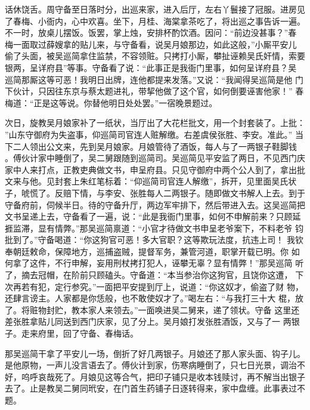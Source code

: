 话休饶舌。周守备至日落时分，出巡来家，进入后厅，左右丫鬟接了冠服。进房见
了春梅、小衙内，心中欢喜。坐下，月桂、海棠拿茶吃了，将出巡之事告诉一遍。
不一时，放桌儿摆饭。饭罢，掌上烛，安排杯酌饮酒。因问：“前边没甚事？”春
梅一面取过薛嫂拿的贴儿来，与守备看，说吴月娘那边，如此这般，”小厮平安儿
偷了头面，被吴巡简拿住监禁，不容领赃。只拷打小厮，攀扯诬赖吴氏奸情，索要
银两，呈详府县”等事。守备看了说：“此事正是我衙门里事，如何呈详府县？吴
巡简那厮这等可恶！我明日出牌，连他都提来发落。”又说：“我闻得吴巡简是他
门下伙计，只因往东京与蔡太题进礼，带挈他做了这个官，如何倒要诬害他家！”
春梅道：“正是这等说。你替他明日处处罢。”一宿晚景题过。

次日，旋教吴月娘家补了一纸状，当厅出了大花栏批文，用一个封套装了。上批：
”山东守御府为失盗事，仰巡简司官连人赃解缴。右差虞侯张胜、李安。准此。”
当下二人领出公文来，先到吴月娘家。月娘管待了酒饭，每人与了一两银子鞋脚钱
。傅伙计家中睡倒了，吴二舅跟随到巡简司。吴巡简见平安监了两日，不见西门庆
家中人来打点，正教吏典做文书，申呈府县。只见守御府中两个公人到了，拿出批
文来与他。见封套上朱红笔标着：“仰巡简司官连人解缴”，拆开，见里面吴氏状
子，唬慌了。反赔下情，与李安、张胜每人二两银子。随即做文书解人上去。到于
守备府前，伺候半日。待的守备升厅，两边军牢排下，然后带进入去。这吴巡简把
文书呈递上去，守备看了一遍，说：“此是我衙门里事，如何不申解前来？只顾延
捱监滞，显有情弊。”那吴巡简禀道：“小官才待做文书申呈老爷案下，不料老爷
钧批到了。”守备喝道：“你这狗官可恶！多大官职？这等欺玩法度，抗违上司！
我钦奉朝廷敕命，保障地方，巡捕盗贼，提督军务，兼管河道，职掌开载已明。你
如何拿了这件，不行申解，妄用刑杖拷打犯人，诬攀无辜？显有情弊！”那吴巡简
听了，摘去冠帽，在阶前只顾磕头。守备道：“本当参治你这狗官，且饶你这遭，
下次再若有犯，定行参究。”一面把平安提到厅上，说道：“你这奴才，偷盗了财
物，还肆言谤主。人家都是你恁般，也不敢使奴才了。”喝左右：“与我打三十大
棍，放了。将赃物封贮，教本家人来领去。”一面唤进吴二舅来，递了领状。守备
这里还差张胜拿贴儿同送到西门庆家，见了分上。吴月娘打发张胜酒饭，又与了一
两银子。走来府里，回了守备、春梅话。

那吴巡简干拿了平安儿一场，倒折了好几两银子。月娘还了那人家头面、钩子儿。
是他原物，一声儿没言语去了。傅伙计到家，伤寒病睡倒了，只七日光景，调治不
好，呜呼哀哉死了。月娘见这等合气，把印子铺只是收本钱赎讨，再不解当出银子
去了。止是教吴二舅同玳安，在门首生药铺子日逐转得来，家中盘缠。此事表过不
题。

